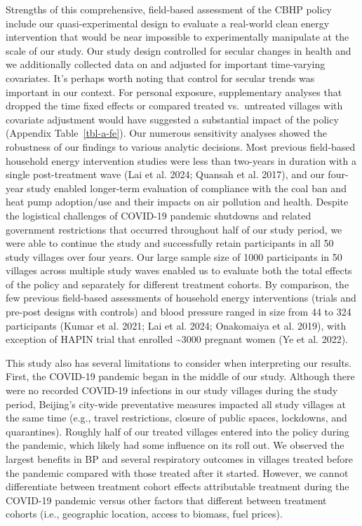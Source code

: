 \documentclass[
  letterpaper,
  DIV=11,
  numbers=noendperiod]{scrartcl}
\begin{document}
Strengths of this comprehensive, field-based assessment of the CBHP
policy include our quasi-experimental design to evaluate a real-world
clean energy intervention that would be near impossible to
experimentally manipulate at the scale of our study. Our study design
controlled for secular changes in health and we additionally collected
data on and adjusted for important time-varying covariates. It's perhaps
worth noting that control for secular trends was important in our
context. For personal exposure, supplementary analyses that dropped the
time fixed effects or compared treated vs.~untreated villages with
covariate adjustment would have suggested a substantial impact of the
policy (Appendix Table~\ref{tbl-a-fe}). Our numerous sensitivity
analyses showed the robustness of our findings to various analytic
decisions. Most previous field-based household energy intervention
studies were less than two-years in duration with a single
post-treatment wave (Lai et al. 2024; Quansah et al. 2017), and our
four-year study enabled longer-term evaluation of compliance with the
coal ban and heat pump adoption/use and their impacts on air pollution
and health. Despite the logistical challenges of COVID-19 pandemic
shutdowns and related government restrictions that occurred throughout
half of our study period, we were able to continue the study and
successfully retain participants in all 50 study villages over four
years. Our large sample size of 1000 participants in 50 villages across
multiple study waves enabled us to evaluate both the total effects of
the policy and separately for different treatment cohorts. By
comparison, the few previous field-based assessments of household energy
interventions (trials and pre-post designs with controls) and blood
pressure ranged in size from 44 to 324 participants (Kumar et al. 2021;
Lai et al. 2024; Onakomaiya et al. 2019), with exception of HAPIN trial
that enrolled \textasciitilde3000 pregnant women (Ye et al. 2022).

This study also has several limitations to consider when interpreting
our results. First, the COVID-19 pandemic began in the middle of our
study. Although there were no recorded COVID-19 infections in our study
villages during the study period, Beijing's city-wide preventative
measures impacted all study villages at the same time (e.g., travel
restrictions, closure of public spaces, lockdowns, and quarantines).
Roughly half of our treated villages entered into the policy during the
pandemic, which likely had some influence on its roll out. We observed
the largest benefits in BP and several respiratory outcomes in villages
treated before the pandemic compared with those treated after it
started. However, we cannot differentiate between treatment cohort
effects attributable treatment during the COVID-19 pandemic versus other
factors that different between treatment cohorts (i.e., geographic
location, access to biomass, fuel prices).
\end{document}

